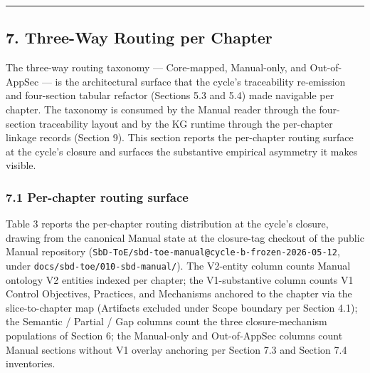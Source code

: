 \documentclass[
]{article}
\begin{document}
\begin{center}\rule{0.5\linewidth}{0.5pt}\end{center}

\subsection{7. Three-Way Routing per
Chapter}\label{three-way-routing-per-chapter}

The three-way routing taxonomy --- Core-mapped, Manual-only, and
Out-of-AppSec --- is the architectural surface that the cycle's
traceability re-emission and four-section tabular refactor (Sections 5.3
and 5.4) made navigable per chapter. The taxonomy is consumed by the
Manual reader through the four-section traceability layout and by the KG
runtime through the per-chapter linkage records (Section 9). This
section reports the per-chapter routing surface at the cycle's closure
and surfaces the substantive empirical asymmetry it makes visible.

\subsubsection{7.1 Per-chapter routing
surface}\label{per-chapter-routing-surface}

Table 3 reports the per-chapter routing distribution at the cycle's
closure, drawing from the canonical Manual state at the closure-tag
checkout of the public Manual repository
(\texttt{SbD-ToE/sbd-toe-manual@cycle-b-frozen-2026-05-12}, under
\texttt{docs/sbd-toe/010-sbd-manual/}). The V2-entity column counts
Manual ontology V2 entities indexed per chapter; the V1-substantive
column counts V1 Control Objectives, Practices, and Mechanisms anchored
to the chapter via the slice-to-chapter map (Artifacts excluded under
Scope boundary per Section 4.1); the Semantic / Partial / Gap columns
count the three closure-mechanism populations of Section 6; the
Manual-only and Out-of-AppSec columns count Manual sections without V1
overlay anchoring per Section 7.3 and Section 7.4 inventories.
\end{document}
